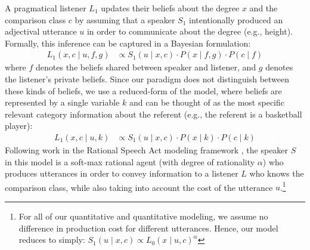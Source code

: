\documentclass[doc]{apa6}
\begin{document}
%
%
%
%
%

A pragmatical listener $L_1$ updates their beliefs about the degree $x$ and the comparison class $c$ by assuming that a speaker $S_1$ intentionally produced an adjectival utterance $u$ in order to communicate about the degree (e.g., height).
Formally, this inference can be captured in a Bayesian formulation:
%
\begin{align}
L_1(x, c \mid u, f, g) &\propto S_1(u \mid x, c) \cdot P(x \mid f, g) \cdot P(c \mid f) \label{eq:L1} 
\end{align}
%
\noindent where $f$ denotes the beliefs shared between speaker and listener, and $g$ denotes the listener's private beliefs. Since our paradigm does not distinguish between these kinds of beliefs, we use a reduced-form of the model, where beliefs are represented by a single variable $k$ and can be thought of as the most specific relevant category information about the referent (e.g., the referent is a basketball player): 
%
\begin{align}
L_1(x, c \mid u, k) &\propto S_1(u \mid x, c) \cdot P(x \mid k) \cdot P(c \mid k) \label{eq:L1a} 
\end{align}
%
Following work in the Rational Speech Act modeling framework \cite{Frank2012, Goodman2016, scontras2017probabilistic}, the speaker $S$ in this model is a soft-max rational agent (with degree of rationality $\alpha$) who produces utterances in order to convey information to a listener $L$ who knows the comparison class, while also taking into account the cost of the utterance $u$.\footnote{For all of our quantitative and quantitative modeling, we assume no difference in production cost for different utterances. Hence, our model reduces to simply: $S_1(u \mid x, c) \propto L_{0}(x \mid u, c)^{ \alpha}$}
\end{document}
